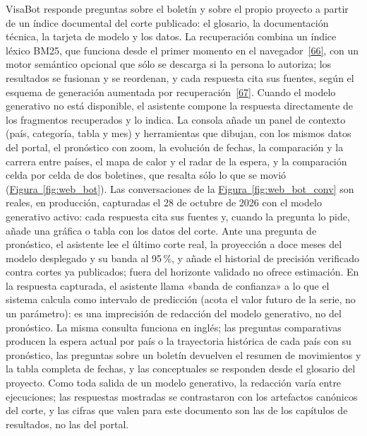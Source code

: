 \documentclass[12pt,letterpaper]{report}
\newcommand{\cita}[1]{\hyperref[bib:#1]{[#1]}}
\begin{document}
VisaBot responde preguntas sobre el boletín y sobre el propio proyecto a partir de un índice
documental del corte publicado: el glosario, la documentación técnica, la tarjeta de modelo y los
datos. La recuperación combina un índice léxico BM25, que funciona desde el primer momento en el
navegador~\cita{66}, con un motor semántico opcional que sólo se descarga si la persona lo
autoriza; los resultados se fusionan y se reordenan, y cada respuesta cita sus fuentes, según el
esquema de generación aumentada por recuperación~\cita{67}. Cuando el modelo generativo no está
disponible, el asistente compone la respuesta directamente de los fragmentos recuperados y lo
indica. La consola añade un panel de contexto (país, categoría, tabla y mes) y herramientas que
dibujan, con los mismos datos del portal, el pronóstico con zoom, la evolución de fechas, la
comparación y la carrera entre países, el mapa de calor y el radar de la espera, y la comparación
celda por celda de dos boletines, que resalta sólo lo que se movió
(\hyperref[fig:web_bot]{Figura~\ref*{fig:web_bot}}). Las conversaciones de la \hyperref[fig:web_bot_conv]{Figura~\ref*{fig:web_bot_conv}} son reales, en producción, capturadas
el 28 de octubre de 2026 con el modelo generativo activo: cada respuesta cita sus fuentes y, cuando
la pregunta lo pide, añade una gráfica o tabla con los datos del corte. Ante una pregunta de
pronóstico, el asistente lee el último corte real, la proyección a doce meses del modelo
desplegado y su banda al 95\,\%, y añade el historial de precisión verificado contra cortes ya
publicados; fuera del horizonte validado no ofrece estimación. En la respuesta capturada, el
asistente llama «banda de confianza» a lo que el sistema calcula como intervalo de predicción
(acota el valor futuro de la serie, no un parámetro): es una imprecisión de redacción del modelo
generativo, no del pronóstico. La misma consulta funciona en
inglés; las preguntas comparativas producen la espera actual por país o la trayectoria histórica
de cada país con su pronóstico, las preguntas sobre un boletín devuelven el resumen de movimientos
y la tabla completa de fechas, y las conceptuales se responden desde el glosario del proyecto. Como
toda salida de un modelo generativo, la redacción varía entre ejecuciones; las respuestas
mostradas se contrastaron con los artefactos canónicos del corte, y las cifras que valen para este
documento son las de los capítulos de resultados, no las del portal.
\end{document}
